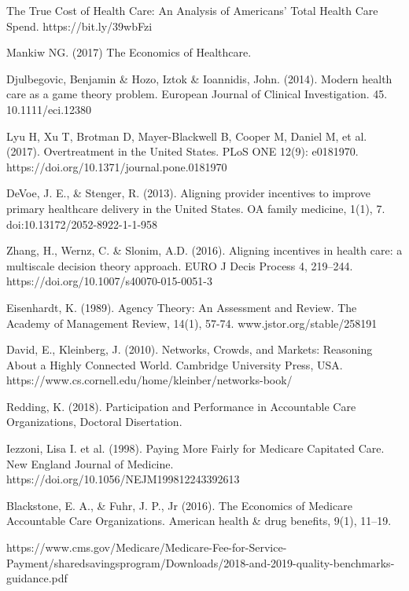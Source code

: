 \documentclass{article}
\begin{document}

\clearpage

\begin{thebibliography}{8}

The True Cost of Health Care: An Analysis of Americans’ Total Health Care Spend. https://bit.ly/39wbFzi

Mankiw NG. (2017) The Economics of Healthcare.

Djulbegovic, Benjamin \& Hozo, Iztok \& Ioannidis, John. (2014). Modern health care as a game theory problem. European Journal of Clinical Investigation. 45. 10.1111/eci.12380

Lyu H, Xu T, Brotman D, Mayer-Blackwell B, Cooper M, Daniel M, et al. (2017). Overtreatment in the United States. PLoS ONE 12(9): e0181970. https://doi.org/10.1371/journal.pone.0181970

DeVoe, J. E., \& Stenger, R. (2013). Aligning provider incentives to improve primary healthcare delivery in the United States. OA family medicine, 1(1), 7. doi:10.13172/2052-8922-1-1-958

Zhang, H., Wernz, C. \& Slonim, A.D. (2016). Aligning incentives in health care: a multiscale decision theory approach. EURO J Decis Process 4, 219–244. https://doi.org/10.1007/s40070-015-0051-3

Eisenhardt, K. (1989). Agency Theory: An Assessment and Review. The Academy of Management Review, 14(1), 57-74. www.jstor.org/stable/258191

David, E., Kleinberg, J. (2010). Networks, Crowds, and Markets: Reasoning About a Highly Connected World. Cambridge University Press, USA. https://www.cs.cornell.edu/home/kleinber/networks-book/

Redding, K. (2018). Participation and Performance in Accountable Care Organizations, Doctoral Disertation.

Iezzoni, Lisa I. et al. (1998). Paying More Fairly for Medicare Capitated Care. New England Journal of Medicine. https://doi.org/10.1056/NEJM199812243392613

Blackstone, E. A., \& Fuhr, J. P., Jr (2016). The Economics of Medicare Accountable Care Organizations. American health \& drug benefits, 9(1), 11–19.

https://www.cms.gov/Medicare/Medicare-Fee-for-Service-Payment/sharedsavingsprogram/Downloads\-/2018-and-2019-quality-benchmarks-guidance.pdf


\end{thebibliography}
\end{document}
